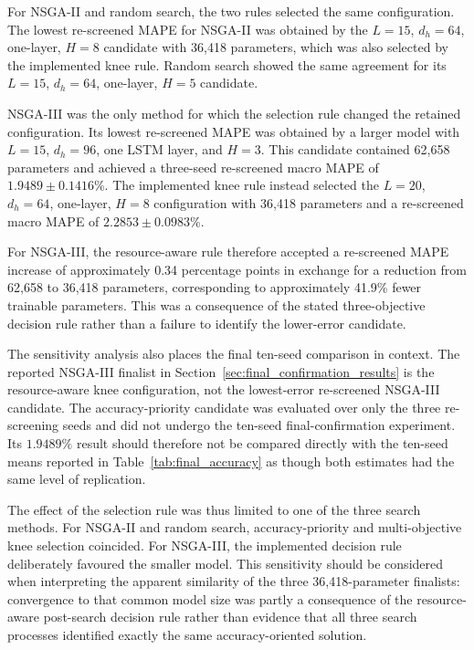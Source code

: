 \documentclass[a4paper,fleqn]{cas-sc}
\begin{document}
For NSGA-II and random search, the two rules selected the same configuration. The lowest re-screened MAPE for NSGA-II was obtained by the $L=15$, $d_h=64$, one-layer, $H=8$ candidate with 36,418 parameters, which was also selected by the implemented knee rule. Random search showed the same agreement for its $L=15$, $d_h=64$, one-layer, $H=5$ candidate.

NSGA-III was the only method for which the selection rule changed the retained configuration. Its lowest re-screened MAPE was obtained by a larger model with $L=15$, $d_h=96$, one LSTM layer, and $H=3$. This candidate contained 62,658 parameters and achieved a three-seed re-screened macro MAPE of $1.9489\pm0.1416$\%. The implemented knee rule instead selected the $L=20$, $d_h=64$, one-layer, $H=8$ configuration with 36,418 parameters and a re-screened macro MAPE of $2.2853\pm0.0983$\%.


For NSGA-III, the resource-aware rule therefore accepted a re-screened MAPE increase of approximately 0.34 percentage points in exchange for a reduction from 62,658 to 36,418 parameters, corresponding to approximately 41.9\% fewer trainable parameters. This was a consequence of the stated three-objective decision rule rather than a failure to identify the lower-error candidate.

The sensitivity analysis also places the final ten-seed comparison in context. The reported NSGA-III finalist in Section~\ref{sec:final_confirmation_results} is the resource-aware knee configuration, not the lowest-error re-screened NSGA-III candidate. The accuracy-priority candidate was evaluated over only the three re-screening seeds and did not undergo the ten-seed final-confirmation experiment. Its $1.9489\%$ result should therefore not be compared directly with the ten-seed means reported in Table~\ref{tab:final_accuracy} as though both estimates had the same level of replication.

The effect of the selection rule was thus limited to one of the three search methods. For NSGA-II and random search, accuracy-priority and multi-objective knee selection coincided. For NSGA-III, the implemented decision rule deliberately favoured the smaller model. This sensitivity should be considered when interpreting the apparent similarity of the three 36,418-parameter finalists: convergence to that common model size was partly a consequence of the resource-aware post-search decision rule rather than evidence that all three search processes identified exactly the same accuracy-oriented solution.
\end{document}
